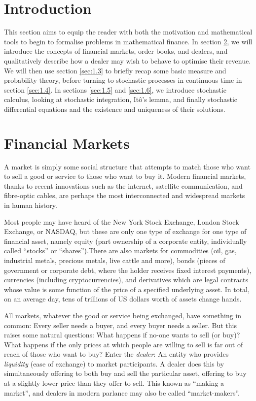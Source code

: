 \section{Introduction}
This section aims to equip the reader with both the motivation and mathematical 
tools to begin to formalise problems in mathematical finance. In section \ref{sec:1.2},
we will introduce the concepts of financial markets, order books, and dealers, and 
qualitatively describe how a dealer may wish to behave to optimise their revenue. We
will then use section \ref{sec:1.3} to briefly recap some basic measure and probability 
theory, before turning to stochastic processes in continuous time in section 
\ref{sec:1.4}. In sections \ref{sec:1.5} and \ref{sec:1.6}, we introduce stochastic 
calculus, looking at stochastic integration, It\^{o}'s lemma, and finally stochastic 
differential equations and the existence and uniqueness of their solutions.

\section{Financial Markets}\label{sec:1.2}
A market is simply some social structure that attempts to match those who want to 
sell a good or service to those who want to buy it. Modern financial markets, 
thanks to recent innovations such as the internet, satellite communication, and 
fibre-optic cables, are perhaps the most interconnected and widespread markets in 
human history. 

Most people may have heard of the New York Stock Exchange, London Stock Exchange, 
or NASDAQ, but these are only one type of exchange for one type of financial asset, 
namely equity (part ownership of a corporate entity, individually called ``stocks'' 
or ``shares'').There are also markets for commodities (oil, gas, industrial metals, 
precious metals, live cattle and more), bonds (pieces of government or corporate 
debt, where the holder receives fixed interest payments), currencies (including 
cryptocurrencies), and derivatives which are legal contracts whose value is some 
function of the price of a specified underlying asset. In total, on an average day, 
tens of trillions of US dollars worth of assets change hands.

All markets, whatever the good or service being exchanged, have something in common: 
Every seller needs a buyer, and every buyer needs a seller. But this raises some 
natural questions: What happens if no-one wants to sell (or buy)? What happens if 
the only prices at which people are willing to sell is far out of reach of those 
who want to buy? Enter the \textit{dealer}: An entity who provides \textit{liquidity} 
(ease of exchange) to market participants. A dealer does this by simultaneously 
offering to both buy and sell the particular asset, offering to buy at a slightly 
lower price than they offer to sell. This known as ``making a market'', and dealers 
in modern parlance may also be called ``market-makers''.

